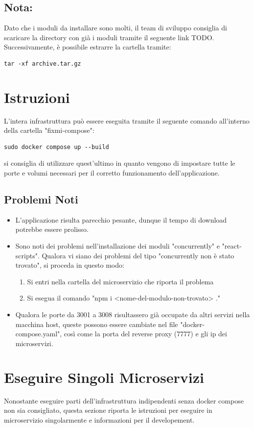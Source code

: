 \documentclass{report}
\begin{document}
\subsection*{Nota:}
Dato che i moduli da installare sono molti, il team di sviluppo consiglia di scaricare la directory con già i moduli tramite il seguente link TODO.
Successivamente, è possibile estrarre la cartella tramite:
\begin{verbatim}
tar -xf archive.tar.gz
\end{verbatim}

\section{Istruzioni}
L'intera infrastruttura può essere eseguita tramite il seguente comando all'interno della cartella "fixmi-compose":
\begin{verbatim}
sudo docker compose up --build
\end{verbatim}
si consiglia di utilizzare quest'ultimo in quanto vengono di impostare tutte le porte e volumi necessari per il corretto funzionamento dell'applicazione.
\subsection*{Problemi Noti}
\begin{itemize}
	\item L'applicazione risulta parecchio pesante, dunque il tempo di download potrebbe essere prolisso.
	\item Sono noti dei problemi nell'installazione dei moduli "concurrently" e "react-scripts". Qualora vi siano dei problemi del tipo "concurrently non è stato trovato", si proceda in questo modo:
\begin{enumerate}
	\item Si entri nella cartella del microservizio che riporta il problema
	\item Si esegua il comando "npm i <nome-del-modulo-non-trovato> ."
\end{enumerate}
    \item Qualora le porte da 3001 a 3008 risultassero già occupate da altri servizi nella macchina host, queste possono essere cambiate nel file "docker-compose.yaml", così come la porta del reverse proxy (7777) e gli ip dei microservizi.
\end{itemize}

\section{Eseguire Singoli Microservizi}
Nonostante eseguire parti dell'infrastruttura indipendenti senza docker compose non sia consigliato, questa sezione riporta le istruzioni per eseguire in microservizio singolarmente e informazioni per il developement.
\end{document}
